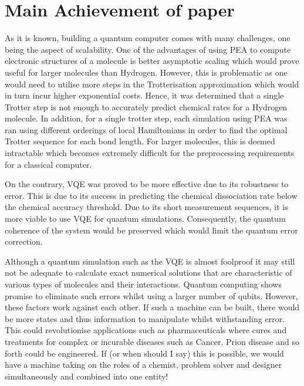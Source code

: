 \documentclass[12pt]{article}
\begin{document}
\section{Main Achievement of paper}
As it is known, building a quantum computer comes with many challenges, one being the aspect of scalability. One of the advantages of using PEA to
compute electronic structures of a molecule is better asymptotic scaling which would prove useful for larger molecules than Hydrogen. However, this
is problematic as one would need to utilise more steps in the Trotterisation approximation which would in turn incur higher exponential costs. Hence,
 it was determined that a single Trotter step is not enough to accurately predict chemical rates for a Hydrogen molecule. In addition, for a single
 trotter step, each simulation using PEA was ran using different orderings of local Hamiltonians in order to find the optimal Trotter sequence for
 each bond length. For larger molecules, this is deemed intractable which becomes extremely difficult for the preprocessing requirements for a
 classical computer.

On the contrary, VQE was proved to be more effective due to its robustness to error. This is due to its success in predicting the chemical dissociation
 rate below the chemical accuracy threshold. Due to its short measurement sequences, it is more viable to use VQE for quantum simulations.
 Consequently, the quantum coherence of the system would be preserved which would limit the quantum error correction.

Although a quantum simulation such as the VQE is almost foolproof it may still not be adequate to calculate exact numerical solutions that are
characteristic of various types of molecules and their interactions. Quantum computing shows promise to eliminate such errors whilst using a
larger number of qubits. However, these factors work against each other. If such a machine can be built, there would be more states and thus
information to manipulate whilst withstanding error. This could revolutionise applications such as pharmaceuticals where cures and treatments
 for complex or incurable diseases such as Cancer, Prion disease and so forth could be engineered. If (or when should I say) this is possible,
  we would have a machine taking on the roles of a chemist, problem solver and designer simultaneously and combined into one entity!
\end{document}
